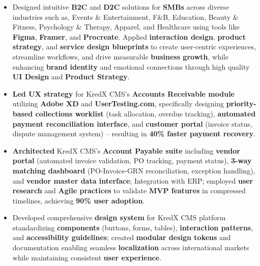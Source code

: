 \documentclass[10pt,a4paper,ragged2e,withhyper]{altacv}
\begin{document}
\begin{paracol}{2}


\begin{itemize}
  \item Designed intuitive \textbf{B2C} and \textbf{D2C} solutions for \textbf{SMBs} across diverse industries such as, Events \& Entertainment, F\&B, Education, Beauty \& Fitness, Psychology \& Therapy, Apparel, and Healthcare using tools like \textbf{Figma}, \textbf{Framer}, and \textbf{Procreate}. Applied \textbf{interaction design}, \textbf{product strategy}, and \textbf{service design blueprints} to create user-centric experiences, streamline workflows, and drive measurable \textbf{business growth}, while enhancing \textbf{brand identity} and emotional connections through high quality \textbf{UI Design} and \textbf{Product Strategy}.
\end{itemize}

\divider

\begin{itemize}
  \item \textbf{Led UX strategy} for KredX CMS's \textbf{Accounts Receivable module} utilizing \textbf{Adobe XD} and \textbf{UserTesting.com}, specifically designing \textbf{priority-based collections worklist} (task allocation, overdue tracking), \textbf{automated payment reconciliation interface}, and \textbf{customer portal} (invoice status, dispute management system) – resulting in \textbf{40\% faster payment recovery}.
  
  \item \textbf{Architected} KredX CMS's \textbf{Account Payable suite} including \textbf{vendor portal} (automated invoice validation, PO tracking, payment status), \textbf{3-way matching dashboard} (PO-Invoice-GRN reconciliation, exception handling), and \textbf{vendor master data interface}; Integration with ERP; employed \textbf{user research} and \textbf{Agile practices} to validate \textbf{MVP features} in compressed timelines, achieving \textbf{90\% user adoption}.
  
  \item Developed comprehensive \textbf{design system} for KredX CMS platform standardizing \textbf{components} (buttons, forms, tables), \textbf{interaction patterns}, and \textbf{accessibility guidelines}; created \textbf{modular design tokens} and documentation enabling seamless \textbf{localization} across international markets while maintaining consistent \textbf{user experience}.
  

\end{itemize}
\end{paracol}
\end{document}
